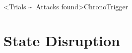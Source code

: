 






\interlude[2]<Trials \textasciitilde\ Attacks found>{ChronoTrigger}

\hypertarget{state-disruption}{%
\section{State Disruption}\label{state-disruption}}


